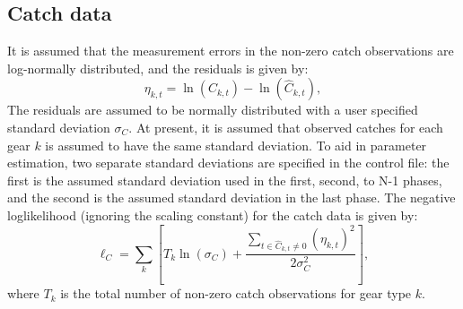 \subsection{Catch data}
It is assumed that the measurement errors in the non-zero catch observations are log-normally distributed, and the residuals is given by:
\begin{equation}\label{eq2}
\eta_{k,t}=\ln(C_{k,t}) -  \ln(\hat{C}_{k,t}),
\end{equation}
The residuals are assumed to be normally distributed with a user specified standard deviation $\sigma_{C}$.  At present, it is assumed that observed catches for each gear $k$ is assumed to have the same standard deviation.  To aid in parameter estimation, two separate standard deviations are specified in the control file: the first is the assumed standard deviation used in the first, second, to N-1 phases, and the second is the assumed standard deviation in the last phase.  The negative loglikelihood (ignoring the scaling constant) for the catch data is given by:
\begin{equation}\label{eq3}
\ell_C = \sum_k\left[  T_k\ln(\sigma_C)+\dfrac{\sum_{t \in \hat{C}_{k,t}\neq 0}(\eta_{k,t})^2}{2\sigma_C^2}\right],
\end{equation}
where $T_k$ is the total number of non-zero catch observations for gear type $k$.


